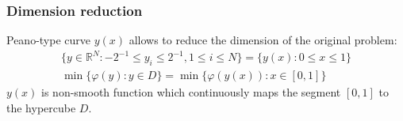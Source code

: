 \documentclass[aspectratio=1610]{beamer}
\begin{document}
\begin{frame}
  \begin{center}


  \frametitle{Dimension reduction}
  Peano-type curve \(y(x)\) allows to reduce the dimension of the original problem:
  \begin{gather}
    \lbrace y\in \mathbb{R}^N:-2^{-1}\leqslant y_i\leqslant 2^{-1},1\leqslant i\leqslant N\rbrace=\{y(x):0\leqslant x\leqslant 1\} \nonumber \\
    \min\{\varphi(y): y\in D\}=\min\{\varphi(y(x)): x\in [0,1]\} \nonumber
  \end{gather}
  \(y(x)\) is non-smooth function which continuously maps the segment \([0,1]\) to the hypercube \(D\).
  \begin{figure}[ht]
    \vspace*{-0.5cm}
  \end{figure}
\end{center}
\end{frame}
\end{document}
